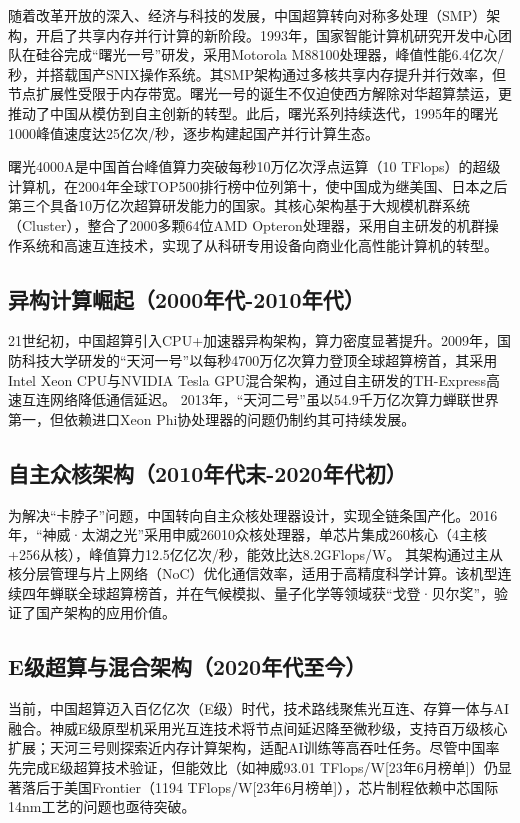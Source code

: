 \documentclass[a4paper]{article}
\begin{document}
随着改革开放的深入、经济与科技的发展，中国超算转向对称多处理（SMP）架构，开启了共享内存并行计算的新阶段。1993年，国家智能计算机研究开发中心团队在硅谷完成“曙光一号”研发，采用Motorola M88100处理器，峰值性能6.4亿次/秒，并搭载国产SNIX操作系统。其SMP架构通过多核共享内存提升并行效率，但节点扩展性受限于内存带宽。曙光一号的诞生不仅迫使西方解除对华超算禁运，更推动了中国从模仿到自主创新的转型。此后，曙光系列持续迭代，1995年的曙光1000峰值速度达25亿次/秒，逐步构建起国产并行计算生态。

曙光4000A是中国首台峰值算力突破每秒10万亿次浮点运算（10 TFlops）的超级计算机，在2004年全球TOP500排行榜中位列第十，使中国成为继美国、日本之后第三个具备10万亿次超算研发能力的国家。其核心架构基于大规模机群系统（Cluster），整合了2000多颗64位AMD Opteron处理器，采用自主研发的机群操作系统和高速互连技术，实现了从科研专用设备向商业化高性能计算机的转型。

\subsection{异构计算崛起（2000年代-2010年代）}
21世纪初，中国超算引入CPU+加速器异构架构，算力密度显著提升。2009年，国防科技大学研发的“天河一号”以每秒4700万亿次算力登顶全球超算榜首，其采用Intel Xeon CPU与NVIDIA Tesla GPU混合架构，通过自主研发的TH-Express高速互连网络降低通信延迟。\cite{2}
2013年，“天河二号”虽以54.9千万亿次算力蝉联世界第一，但依赖进口Xeon Phi协处理器的问题仍制约其可持续发展。

\subsection{自主众核架构（2010年代末-2020年代初）}
为解决“卡脖子”问题，中国转向自主众核处理器设计，实现全链条国产化。2016年，“神威·太湖之光”采用申威26010众核处理器，单芯片集成260核心（4主核+256从核），峰值算力12.5亿亿次/秒，能效比达8.2GFlops/W。\cite{3}
其架构通过主从核分层管理与片上网络（NoC）优化通信效率，适用于高精度科学计算。该机型连续四年蝉联全球超算榜首，并在气候模拟、量子化学等领域获“戈登·贝尔奖”，验证了国产架构的应用价值。

\subsection{E级超算与混合架构（2020年代至今）}
当前，中国超算迈入百亿亿次（E级）时代，技术路线聚焦光互连、存算一体与AI融合。神威E级原型机采用光互连技术将节点间延迟降至微秒级，支持百万级核心扩展；天河三号则探索近内存计算架构，适配AI训练等高吞吐任务。尽管中国率先完成E级超算技术验证，但能效比（如神威93.01 TFlops/W[23年6月榜单]）仍显著落后于美国Frontier（1194 TFlops/W[23年6月榜单]），芯片制程依赖中芯国际14nm工艺的问题也亟待突破。
\end{document}
